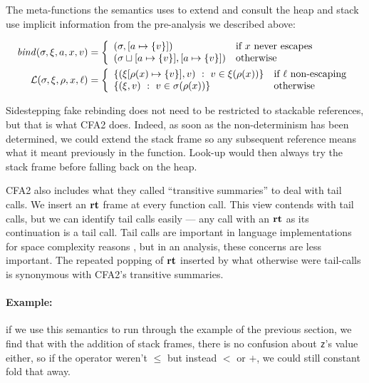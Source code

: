 \documentclass{llncs}
\begin{document}
The meta-functions the semantics uses to extend and consult the heap
and stack use implicit information from the pre-analysis we described
above:

\begin{align*}
  \mathit{bind}(\sigma,\xi,a,x,v) &=
   \left\{\begin{array}{ll}
            (\sigma, [a \mapsto \{ v \}]) & \text{if } x \text{ never escapes} \\
            (\sigma\sqcup[a \mapsto \{ v \}], [a \mapsto \{ v \}]) & \text{otherwise } \\
          \end{array}\right. \\
  {\mathcal L}(\sigma,\xi,\rho,x,\ell) &=
    \left\{\begin{array}{ll}
          \{ (\xi[\rho(x) \mapsto \{ v \}], v)\ :\ v \in \xi(\rho(x))\}
                   & \text{if } \ell \text{ non-escaping} \\
          \{ (\xi,v)\ :\ v \in \sigma(\rho(x))\} & \text{otherwise}
           \end{array}\right.
\end{align*}

Sidestepping fake rebinding does not need to be restricted to
stackable references, but that is what CFA2 does. Indeed, as soon as
the non-determinism has been determined, we could extend the stack
frame so any subsequent reference means what it meant previously in
the function. Look-up would then always try the stack frame before
falling back on the heap.

CFA2 also includes what they called ``transitive summaries'' to deal
with tail calls. We insert an $\mathbf{rt}$ frame at every function call.
This view contends with tail calls, but we can identify tail calls
easily --- any call with an $\mathbf{rt}$ as its continuation is a tail
call. Tail calls are important in language implementations for space
complexity reasons \citep{ianjohnson:clinger:tail-calls:1998}, but in
an analysis, these concerns are less important. The repeated popping
of $\mathbf{rt}$ inserted by what otherwise were tail-calls is synonymous with
CFA2's transitive summaries.

\paragraph{Example:} if we use this semantics to run through the
example of the previous section, we find that with the addition of
stack frames, there is no confusion about \texttt{z}'s value either,
so if the operator weren't $\le$ but instead $<$ or $+$, we could
still constant fold that away.
\end{document}
